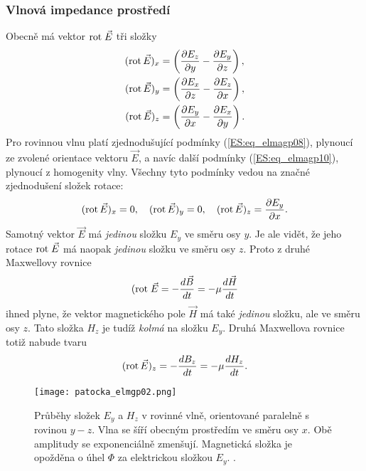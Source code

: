       \subsubsection{Vlnová impedance prostředí}
        Obecně má vektor \(\mathrm{rot}\;\vec{E}\) tři složky
        \begin{align}
          (\text{rot}\,\vec{E})_x &=\left(\dfrac{\partial E_z}{\partial y}-\dfrac{\partial E_y}{\partial z}\right), \nonumber \\
          (\text{rot}\,\vec{E})_y &=\left(\dfrac{\partial E_x}{\partial z}-\dfrac{\partial E_z}{\partial x}\right), \nonumber \\
          (\text{rot}\,\vec{E})_z &=\left(\dfrac{\partial E_y}{\partial x}-\dfrac{\partial E_x}{\partial y}\right). \label{ES:eq_elmagp22}
        \end{align}
        Pro rovinnou vlnu platí zjednodušující podmínky (\ref{ES:eq_elmagp08}), plynoucí ze zvolené 
        orientace vektoru \(\vec{E}\), a navíc další podmínky (\ref{ES:eq_elmagp10}), plynoucí z 
        homogenity vlny. Všechny tyto podmínky vedou na značné zjednodušení složek rotace:
        \begin{equation}\label{ES:eq_elmagp23}
          (\text{rot}\,\vec{E})_x = 0, \quad
          (\text{rot}\,\vec{E})_y = 0, \quad
          (\text{rot}\,\vec{E})_z = \dfrac{\partial E_y}{\partial x}.
        \end{equation}
        Samotný vektor \(\vec{E}\) má \emph{jedinou} složku \(E_y\) ve směru osy \(y\). Je ale 
        vidět, že jeho rotace \(\mathrm{rot}\;\vec{E}\) má naopak \emph{jedinou} složku ve směru osy \(z\). Proto 
        z druhé Maxwellovy rovnice
        \begin{equation}\label{ES:eq_elmagp24}
          (\mathrm{rot}\;\vec{E} = -\dfrac{d \vec{B}}{d t} = -\mu\dfrac{d \vec{H}}{d t}
        \end{equation}
        ihned plyne, že vektor magnetického pole \(\vec{H}\) má také \emph{jedinou} složku, ale ve 
        směru osy \(z\). Tato složka \(H_z\) je tudíž \emph{kolmá} na složku \(E_y\). Druhá 
        Maxwellova rovnice totiž nabude tvaru
        \begin{equation}\label{ES:eq_elmagp25}
          (\text{rot}\,\vec{E})_z = - \dfrac{d B_z}{d t} = -\mu\dfrac{d H_z}{d t}.
        \end{equation}
        \begin{figure}[ht!]   
          \centering
          \texttt{[image: patocka\_elmgp02.png]}
          \caption{Průběhy složek \(E_y\) a \(H_z\) v rovinné vlně, orientované paralelně s rovinou 
                   \(y-z\). Vlna se šíří obecným prostředím ve směru osy \(x\). Obě amplitudy se 
                   exponenciálně zmenšují. Magnetická složka je opožděna o úhel \(\Phi\) za 
                   elektrickou složkou \(E_y\). \cite[s.~74]{Patocka4}.}
          \label{ES:fig_elmgp02}
        \end{figure}

